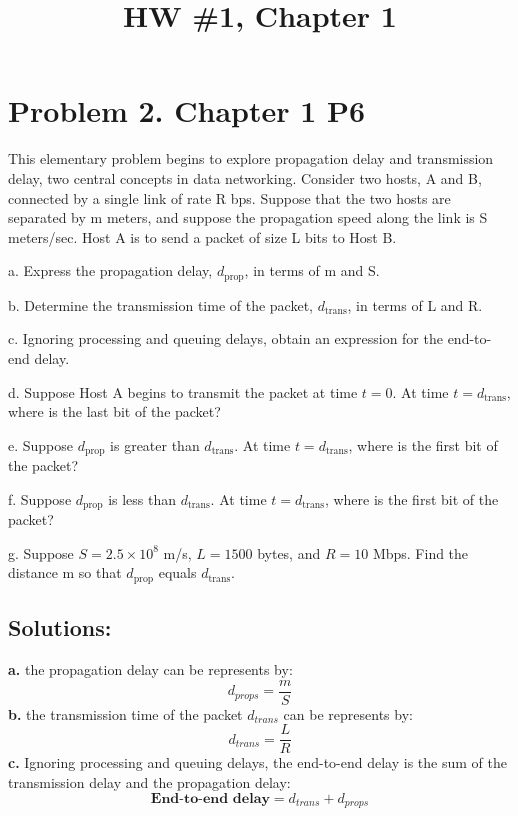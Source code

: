\documentclass{cshwk}
\begin{document}
\title{HW \#1, Chapter 1}
\maketitle

\section*{Problem 2. Chapter 1 P6}
This elementary problem begins to explore propagation delay and transmission delay, two central concepts in data networking. Consider two hosts, A and B, connected by a single link of rate R bps. Suppose that the two hosts are separated by m meters, and suppose the propagation speed along the link is S meters/sec. Host A is to send a packet of size L bits to Host B.

a. Express the propagation delay, \( d_{\text{prop}} \), in terms of m and S.

b. Determine the transmission time of the packet, \( d_{\text{trans}} \), in terms of L and R.

c. Ignoring processing and queuing delays, obtain an expression for the end-to-end delay.

d. Suppose Host A begins to transmit the packet at time \( t = 0 \). At time \( t = d_{\text{trans}} \), where is the last bit of the packet?

e. Suppose \( d_{\text{prop}} \) is greater than \( d_{\text{trans}} \). At time \( t = d_{\text{trans}} \), where is the first bit of the packet?

f. Suppose \( d_{\text{prop}} \) is less than \( d_{\text{trans}} \). At time \( t = d_{\text{trans}} \), where is the first bit of the packet?

g. Suppose \( S = 2.5 \times 10^8 \) m/s, \( L = 1500 \) bytes, and \( R = 10 \) Mbps. Find the distance m so that \( d_{\text{prop}} \) equals \( d_{\text{trans}} \).

\subsection*{Solutions:}

\noindent\textbf{a.} the propagation delay can be represents by:
$$
    \boxed{
        d_{props} = \frac{m}{S}
    }
$$
\noindent\textbf{b.} the transmission time of the packet $d_{trans}$ can be represents by:
$$
    \boxed{
        d_{trans} = \frac{L}{R}
    }
$$
\noindent\textbf{c.} Ignoring processing and queuing delays, the end-to-end delay is the sum of the transmission delay and the propagation delay:
$$
    \boxed{
        \textbf{End-to-end delay} = d_{trans} + d_{props}
    }
$$
\end{document}
